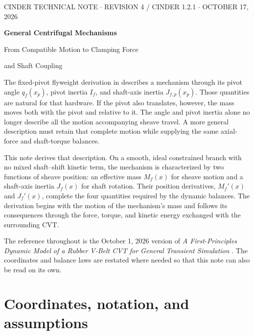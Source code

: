 \documentclass[11pt,letterpaper]{article}
\numberwithin{equation}{section}
\newcommand{\source}{\cite{formulation}}
\begin{document}
\thispagestyle{plain}
\begin{center}
{\small CINDER TECHNICAL NOTE \quad $\cdot$ \quad REVISION 4 / CINDER 1.2.1 \quad $\cdot$ \quad OCTOBER 17, 2026}
\vspace{0.7em}

{\LARGE\bfseries General Centrifugal Mechanisms\par}
\vspace{0.45em}
{\large From Compatible Motion to Clamping Force\par and Shaft Coupling\par}
\end{center}
\vspace{0.4em}

The fixed-pivot flyweight derivation in \source{} describes a mechanism through its pivot angle $q_f(x_p)$, pivot inertia $I_f$, and shaft-axis inertia $J_{f,p}(x_p)$. Those quantities are natural for that hardware. If the pivot also translates, however, the mass moves both with the pivot and relative to it. The angle and pivot inertia alone no longer describe all the motion accompanying sheave travel. A more general description must retain that complete motion while supplying the same axial-force and shaft-torque balances.

This note derives that description. On a smooth, ideal constrained branch with no mixed shaft--shift kinetic term, the mechanism is characterized by two functions of sheave position: an effective mass $M_f(x)$ for sheave motion and a shaft-axis inertia $J_f(x)$ for shaft rotation. Their position derivatives, $M_f'(x)$ and $J_f'(x)$, complete the four quantities required by the dynamic balances. The derivation begins with the motion of the mechanism's mass and follows its consequences through the force, torque, and kinetic energy exchanged with the surrounding CVT.

The reference throughout is the October 1, 2026 version of \emph{A First-Principles Dynamic Model of a Rubber V-Belt CVT for General Transient Simulation} \source. The coordinates and balance laws are restated where needed so that this note can also be read on its own.

\begingroup
\small
\setlength{\parskip}{0pt}
\hypertarget{note-contents}{}
\tableofcontents
\endgroup

\clearpage
\section{Coordinates, notation, and assumptions}
\label{sec:scope}
\end{document}
